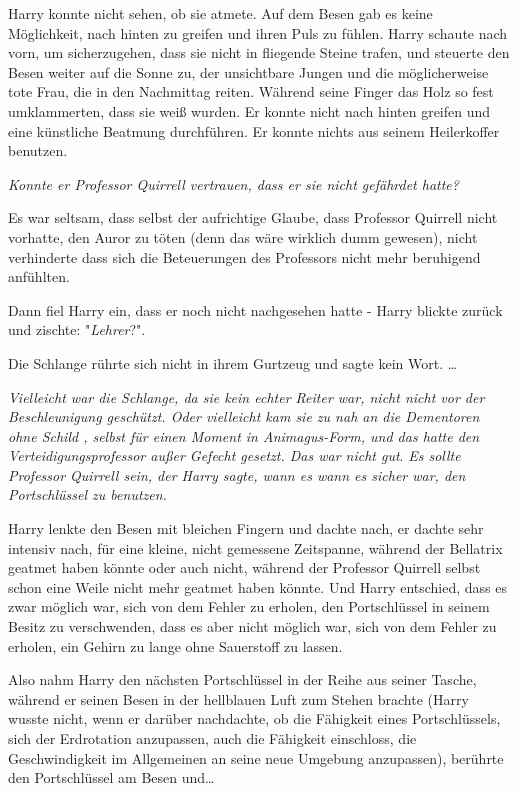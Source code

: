 {Harry konnte nicht sehen, ob sie atmete. Auf dem Besen gab es keine Möglichkeit, nach hinten zu greifen und ihren Puls zu fühlen. Harry schaute nach vorn, um sicherzugehen, dass sie nicht in fliegende Steine trafen, und steuerte den Besen weiter auf die Sonne zu, der unsichtbare Jungen und die möglicherweise tote Frau, die in den Nachmittag reiten. Während seine Finger das Holz so fest umklammerten, dass sie weiß wurden. Er konnte nicht nach hinten greifen und eine künstliche Beatmung durchführen. Er konnte nichts aus seinem Heilerkoffer benutzen.

\emph{Konnte er Professor Quirrell vertrauen, dass er sie nicht gefährdet hatte?}

Es war seltsam, dass selbst der aufrichtige Glaube, dass Professor Quirrell nicht vorhatte, den Auror zu töten (denn das wäre wirklich dumm gewesen), nicht verhinderte dass sich die Beteuerungen des Professors nicht mehr beruhigend anfühlten.

Dann fiel Harry ein, dass er noch nicht nachgesehen hatte - Harry blickte zurück und zischte: "\emph{Lehrer}?".

Die Schlange rührte sich nicht in ihrem Gurtzeug und sagte kein Wort. …

\emph{Vielleicht war die Schlange, da sie kein echter Reiter war, nicht nicht vor der Beschleunigung geschützt. Oder vielleicht kam sie zu nah an die Dementoren ohne Schild , selbst für einen Moment in Animagus-Form, und das hatte den Verteidigungsprofessor außer Gefecht gesetzt. Das war nicht gut}. \emph{Es sollte Professor Quirrell sein, der Harry sagte, wann es wann es sicher war, den Portschlüssel zu benutzen.}

Harry lenkte den Besen mit bleichen Fingern und dachte nach, er dachte sehr intensiv nach, für eine kleine, nicht gemessene Zeitspanne, während der Bellatrix geatmet haben könnte oder auch nicht, während der Professor Quirrell selbst schon eine Weile nicht mehr geatmet haben könnte. Und Harry entschied, dass es zwar möglich war, sich von dem Fehler zu erholen, den Portschlüssel in seinem Besitz zu verschwenden, dass es aber nicht möglich war, sich von dem Fehler zu erholen, ein Gehirn zu lange ohne Sauerstoff zu lassen.

Also nahm Harry den nächsten Portschlüssel in der Reihe aus seiner Tasche, während er seinen Besen in der hellblauen Luft zum Stehen brachte (Harry wusste nicht, wenn er darüber nachdachte, ob die Fähigkeit eines Portschlüssels, sich der Erdrotation anzupassen, auch die Fähigkeit einschloss, die Geschwindigkeit im Allgemeinen an seine neue Umgebung anzupassen), berührte den Portschlüssel am Besen und…

}

